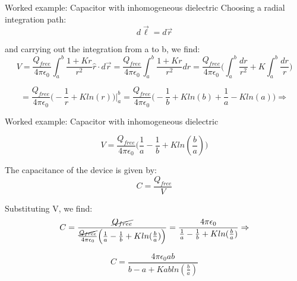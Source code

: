 {\begin{frame}{Worked example: Capacitor with inhomogeneous dielectric}
  Choosing a radial integration path:
  \begin{equation*}
    d\vec{\ell}=d\vec{r}
  \end{equation*}

  and carrying out the integration from a to b, we find:
  \begin{equation*}
     V =
     \frac{Q_{free}}{4\pi \epsilon_0} \int_{a}^{b} \frac{1+Kr}{r^2} \hat{r} \cdot d\vec{r} =
     \frac{Q_{free}}{4\pi \epsilon_0} \int_{a}^{b} \frac{1+Kr}{r^2} dr =
     \frac{Q_{free}}{4\pi \epsilon_0}
       \Big( \int_{a}^{b} \frac{dr}{r^2} + K \int_{a}^{b} \frac{dr}{r} \Big)
  \end{equation*}

  \begin{equation*}
       = \frac{Q_{free}}{4\pi \epsilon_0}
       \Big( -\frac{1}{r} + K ln(r) \Big) \Bigg\rvert_{a}^{b} =
         \frac{Q_{free}}{4\pi \epsilon_0}
       \Big( -\frac{1}{b} + K ln(b) + \frac{1}{a} - K ln(a) \Big) \Rightarrow
  \end{equation*}

\end{frame}

%
%
%

\begin{frame}{Worked example: Capacitor with inhomogeneous dielectric}

  \begin{equation*}
     V = \frac{Q_{free}}{4\pi \epsilon_0}
       \Big( \frac{1}{a} - \frac{1}{b} + K ln(\frac{b}{a}) \Big)
  \end{equation*}

  The capacitance of the device is given by:
  \begin{equation*}
     C = \frac{Q_{free}}{V}
  \end{equation*}

  Substituting V, we find:
  \begin{equation*}
     \displaystyle
     C = \frac{\cancel{Q_{free}}}{
       \frac{\cancel{Q_{free}}}{4\pi \epsilon_0}
          \Big( \frac{1}{a} - \frac{1}{b} + K ln(\frac{b}{a}) \Big) }
       = \frac{4\pi\epsilon_0}
              {\frac{1}{a} - \frac{1}{b} + K ln(\frac{b}{a})} \Rightarrow
  \end{equation*}

  \begin{equation*}
     \displaystyle
     C = \frac{4\pi\epsilon_0 a b}{b - a + K a b ln(\frac{b}{a})}
  \end{equation*}


\end{frame}}
